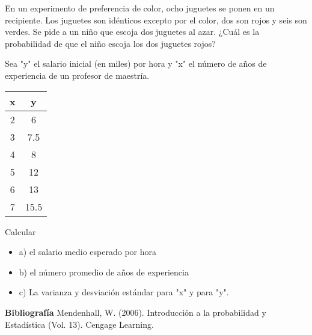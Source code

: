 \documentclass{../oxmathproblems}
\begin{document}
\begin{questions}
\miquestion En un experimento de preferencia de color, ocho juguetes se ponen en un recipiente. Los juguetes son idénticos excepto por el color, dos son rojos y seis son verdes. Se pide a un niño que escoja dos juguetes al azar. ¿Cuál es la probabilidad de que el niño escoja los dos juguetes rojos?

\miquestion Sea "y" el salario inicial (en miles) por hora y "x" el número de años de experiencia de un profesor de maestría. 
\begin{center}
\begin{tabular}{ |c|c| } 
 \hline
 \textbf{x} & \textbf{y} \\ 
 \hline
 2 & 6 \\
 3  & 7.5 \\
4 & 8\\ 
5 & 12 \\ 
6 & 13 \\ 
7 & 15.5 \\ 
 \hline
\end{tabular}
\end{center}
Calcular   
\begin{itemize}
\item  a) el salario medio esperado por hora
\item  b) el número promedio de años de experiencia 
\item  c) La varianza y desviación estándar para "x" y para "y". 
\end{itemize}

\end{questions}

\textbf{Bibliografía}
Mendenhall, W. (2006). Introducción a la probabilidad y Estadística (Vol. 13). Cengage Learning.
\end{document}
